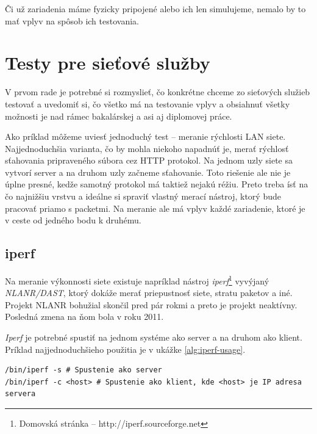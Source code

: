 Či už zariadenia máme fyzicky pripojené alebo ich len simulujeme, nemalo by to
mať vplyv na spôsob ich testovania.

%
%

\section{Testy pre sieťové služby}

V prvom rade je potrebné si rozmyslieť, čo konkrétne chceme zo sieťových
služieb testovať a uvedomiť si, čo všetko má na testovanie vplyv a obsiahnuť
všetky možnosti je nad rámec bakalárskej a asi aj diplomovej práce.

Ako príklad môžeme uviesť jednoduchý test -- meranie rýchlosti LAN siete.
Najjednoduchšia varianta, čo by mohla niekoho napadnúť je, merať rýchlosť
sťahovania pripraveného súbora cez HTTP protokol. Na jednom uzly siete sa
vytvorí server a na druhom uzly začneme sťahovanie. Toto riešenie ale nie je
úplne presné, kedže samotný protokol má taktiež nejakú réžiu. Preto treba ísť
na čo najnižšiu vrstvu a ideálne si spraviť vlastný merací nástroj, ktorý bude
pracovať priamo s packetmi. Na meranie ale má vplyv každé zariadenie, ktoré je
v ceste od jedného bodu k druhému.

%
%

\subsection{iperf}

Na meranie výkonnosti siete existuje napríklad nástroj
\emph{iperf}\footnote{Domovská stránka -- http://iperf.sourceforge.net}
vyvýjaný \emph{NLANR/DAST}, ktorý dokáže merať priepustnosť siete, stratu
paketov a iné.  Projekt NLANR bohužial skončil pred pár rokmi a preto je
projekt neaktívny.  Posledná zmena na ňom bola v roku 2011.

\emph{Iperf} je potrebné spustiť na jednom systéme ako server a na druhom ako
klient. Príklad najjednoduchšieho použitia je v ukážke \ref{alg:iperf-usage}.
\\
\renewcommand{\lstlistingname}{Ukážka}
\begin{lstlisting}[label=alg:iperf-usage,caption=Príklad použitia iperf]
/bin/iperf -s # Spustenie ako server
/bin/iperf -c <host> # Spustenie ako klient, kde <host> je IP adresa servera
\end{lstlisting}
\renewcommand{\lstlistingname}{\listingAlgoritmus}

